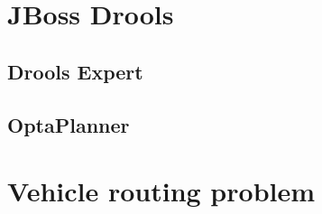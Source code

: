 
\section{JBoss Drools}

  \subsection{Drools Expert}

  \subsection{OptaPlanner}


\section{Vehicle routing problem}
